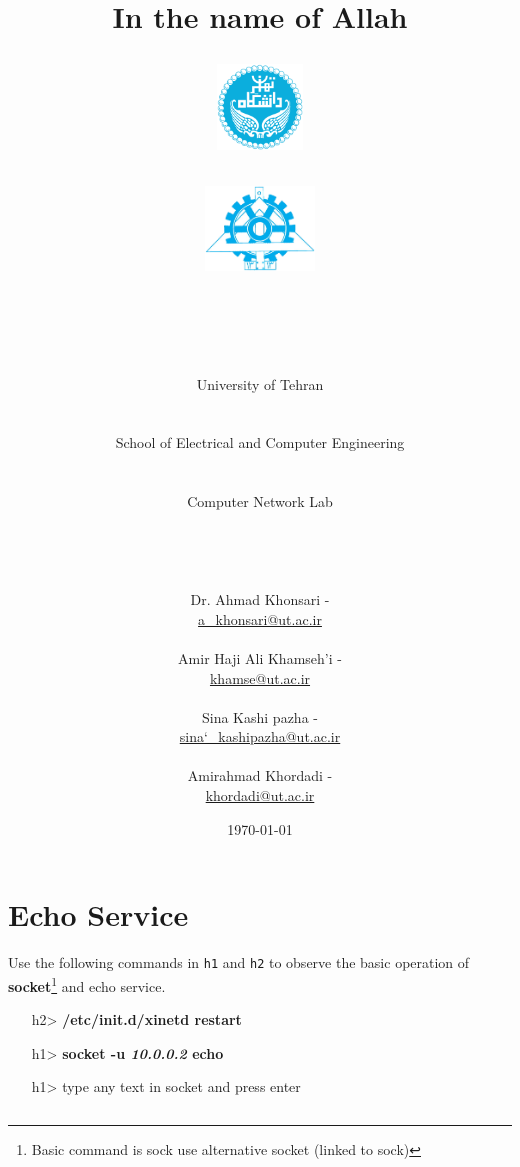 \documentclass[10pt,a4paper]{article}
\title{
\normalsize In the name of Allah\\
\vspace{10pt}
\LARGE\FR{بسم \allah الرحمن الرحیم}
\vspace{10pt}
\begin{center}
	\begin{minipage}{0.48\textwidth} \begin{flushleft}
			\includegraphics[height=64pt,width=64pt]{img/logo.png}
	\end{flushleft}\end{minipage}
	\begin{minipage}{0.48\textwidth} \begin{flushright}
			\includegraphics[height=64pt]{img/eng-logo.png}
	\end{flushright}\end{minipage}
\end{center}
\vspace*{-64pt}
	\huge \titleText\\
\vspace{40pt}
}
\author{
	\huge University of Tehran\\
	\LARGE \FR{دانشگاه تهران}\\
	\\
	\LARGE School of Electrical and Computer Engineering\\
	\FR{دانشکده مهندسی برق و کامپیوتر}\\
	\\
	\Large Computer Network Lab\\
	\FR{آزمایشگاه شبکه‌های کامپیوتری}\\
	\\
	\\
	\\
	\normalfont
	Dr. Ahmad Khonsari - \FR{احمد خونساری}\\
	\href{mailto:a_khonsari@ut.ac.ir}{a\_khonsari@ut.ac.ir}\\
	\\
	\normalsize
	Amir Haji Ali Khamseh'i - \FR{امیر حاجی علی خمسه‌ء}\\
	\href{mailto:khamse@ut.ac.ir}{khamse@ut.ac.ir}\\
	\\
	\normalsize
	Sina Kashi pazha - \FR{سینا کاشی پزها}\\
	\href{mailto:sina\char`_kashipazha@ut.ac.ir}{sina\char`_kashipazha@ut.ac.ir}\\
	\\
	\normalsize
	Amirahmad Khordadi - \FR{امیر احمد خردادی}\\
	\href{mailto:khordadi@ut.ac.ir}{khordadi@ut.ac.ir}
}
\date{\vspace{30pt}\today\\\vspace{10pt}{\selectlanguage{farsi}\today}}
\numberwithin{equation}{section}
\numberwithin{figure}{section}
\numberwithin{table}{section}
\begin{document}

\maketitle


\pagebreak




\section{Echo Service}
Use the following commands in \texttt{h1} and \texttt{h2} to observe the basic operation of \textbf{socket}\footnote{Basic command is sock use alternative socket (linked to sock)} and echo service. \\
\begin{itemize}
	\item [h2>] \textbf{/etc/init.d/xinetd restart}
	\item [h1>] \textbf{socket -u \textit{10.0.0.2} echo}
	\item [h1>]type any text in socket and press enter
\end{itemize}
\begin{lstlisting}[language=bash]
\end{lstlisting}
\end{document}

